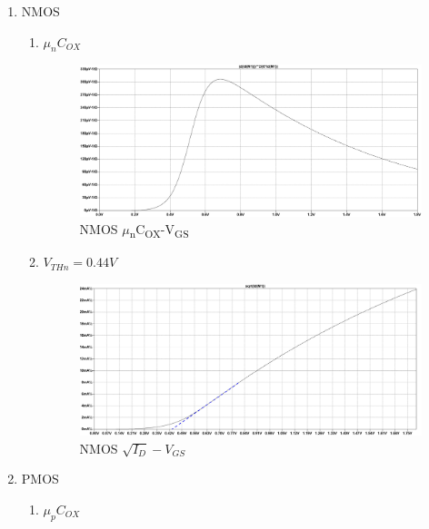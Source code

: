 \documentclass{article}
\begin{document}
\begin{enumerate}
\begin{enumerate}
\item NMOS
\begin{enumerate}
\item \(\mu_{n}C_{OX}\)

\begin{figure}[H]
\centering
\includegraphics[width=.9\linewidth]{img/q3/b/nmos-ucox-vgs.pdf}
\caption{\label{fig:nmos-ucox-vgs}NMOS \(\mu\)\textsubscript{n}C\textsubscript{OX}-V\textsubscript{GS}}
\end{figure}
\item \(V_{THn} = 0.44V\)
\begin{figure}[H]
\centering
\includegraphics[width=.9\linewidth]{img/q3/b/nmos-sqrt-id-vgs.pdf}
\caption{\label{fig:nmos-sqrt-id-vgs}NMOS \(\sqrt{I_{D}}-V_{GS}\)}
\end{figure}
\end{enumerate}
\item PMOS
\begin{enumerate}
\item \(\mu_{p}C_{OX}\)


\end{enumerate}
\end{enumerate}
\end{enumerate}
\end{document}

